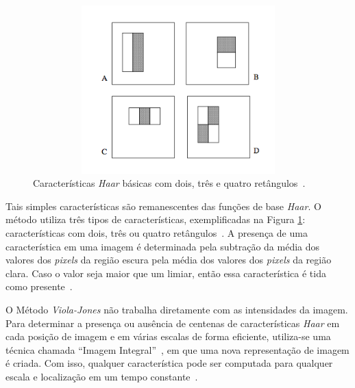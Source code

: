 \begin{figure}[H]
		\begin{center}
			\includegraphics[height=6.5cm,width=12.5cm]{figuras/2.FundamentacaoTeorica/haarfeaturestypes.png}
		\end{center}
		\caption{Características \textit{Haar} básicas com dois, três e quatro retângulos~\cite{violajones}.}
		\label{haarfeaturestypes}
\end{figure}

Tais simples características são remanescentes das funções de base \textit{Haar}. O método utiliza três tipos de características, exemplificadas na Figura \ref{haarfeaturestypes}: características com dois, três ou quatro retângulos~\cite{violajones}. A presença de uma característica em uma imagem é determinada pela subtração da média dos valores dos \textit{pixels} da região escura pela média dos valores dos \textit{pixels} da região clara. Caso o valor seja maior que um limiar, então essa característica é tida como presente~\cite{servodetection}.

O Método \textit{Viola-Jones} não trabalha diretamente com as intensidades da imagem. Para determinar a presença ou ausência de centenas de características \textit{Haar} em cada posição de imagem e em várias escalas de forma eficiente, utiliza-se uma técnica chamada ``Imagem Integral''~\cite{servodetection, violajones}, em que uma nova representação de imagem é criada. Com isso, qualquer característica pode ser computada para qualquer escala e localização em um tempo constante~\cite{violajones}.


